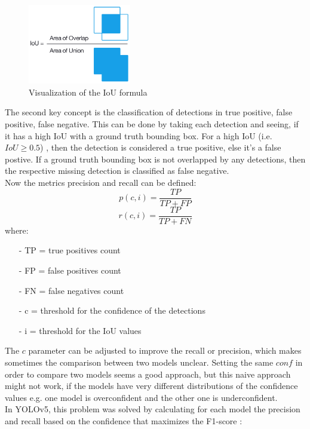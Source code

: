 \begin{figure}[!hb]

  \includegraphics[width=0.4\textwidth]{images/iou}
  \centering
  \caption{Visualization of the IoU formula \cite{map_tutorial}}
  \label{fig:iou}
\end{figure}

The second key concept is the classification of detections in true positive, false positive, false negative. This can be done by taking each detection and seeing, if it has a high IoU with a ground truth bounding box. For a high IoU (i.e. $IoU \geq 0.5$) , then the detection is considered a true positive, else it's a false postive. If a ground truth bounding box is not overlapped by any detections, then the respective missing detection is classified as false negative.\\
Now the metrics precision and recall can be defined:
\begin{equation}
p(c,i) = \frac{TP}{TP + FP}
\end{equation}
\begin{equation}
r(c,i) = \frac{TP}{TP + FN}
\end{equation}
where:
\begin{itemize}
\item[-]{TP = true positives count}
\item[-]{FP = false positives count}
\item[-]{FN = false negatives count}
\item[-]{c = threshold for the confidence of the detections}
\item[-]{i = threshold for the IoU values}
\end{itemize}

The $c$ parameter can be adjusted to improve the recall or precision, which makes sometimes the comparison between two models unclear. Setting the same $conf$ in order to compare two models seems a good approach, but this naive approach might not work, if the models have very different distributions of the confidence values e.g. one model is overconfident and the other one is underconfident. \\
In YOLOv5, this problem was solved by calculating for each model the precision and recall based on the confidence that maximizes the F1-score  \cite{yolov5_conf}:

